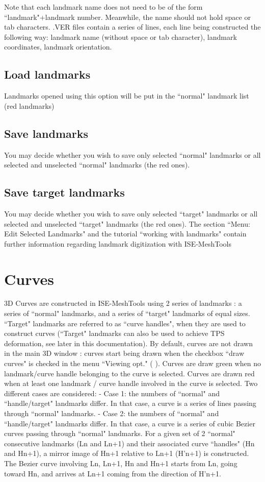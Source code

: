 Note that each landmark name does not need
to be of the form ``landmark"+landmark number. Meanwhile, the name should not hold space or tab
characters.
.VER files contain a series
of lines, each line being
constructed the following
way: landmark name
(without space or tab
character), landmark
coordinates, landmark
orientation.

\subsection{Load landmarks}
Landmarks opened using this option will be put in the ``normal" landmark list (red landmarks)
\subsection{Save landmarks}
You may decide whether you wish to save only selected ``normal" landmarks or all selected and
unselected ``normal" landmarks (the red ones).
\subsection{Save target landmarks}

You may decide whether you wish to save only selected ``target" landmarks or all selected and
unselected ``target" landmarks (the red ones).
The section ``Menu: Edit Selected Landmarks" and the tutorial ``working with landmarks" contain
further information regarding landmark digitization with ISE-MeshTools

\section{Curves}
3D Curves are constructed in ISE-MeshTools using 2 series of landmarks : a series of ``normal"
landmarks, and a series of ``target" landmarks of equal sizes. ``Target" landmarks are referred to as
``curve handles", when they are used to construct curves (``Target" landmarks can also be used to
achieve TPS deformation, see later in this documentation). By default, curves are not drawn in the
main 3D window : curves start being drawn when the checkbox ``draw curves" is checked in the menu
``Viewing opt." ( ). Curves are draw green when no landmark/curve handle belonging to
the curve is selected. Curves are drawn red when at least one landmark / curve handle involved in the
curve is selected. Two different cases are considered:
- Case 1: the numbers of ``normal" and ``handle/target" landmarks differ. In that case, a curve is a
series of lines passing through ``normal" landmarks.
- Case 2: the numbers of ``normal" and ``handle/target" landmarks differ. In that case, a curve is a
series of cubic Bezier curves passing through ``normal" landmarks. For a given set of 2 ``normal"
consecutive landmarks (Ln and Ln+1) and their associated curve ``handles" (Hn and Hn+1), a mirror
image of Hn+1 relative to Ln+1 (H’n+1) is constructed. The Bezier curve involving Ln, Ln+1, Hn and
Hn+1 starts from Ln, going toward Hn, and arrives at Ln+1 coming from the direction of H’n+1.

